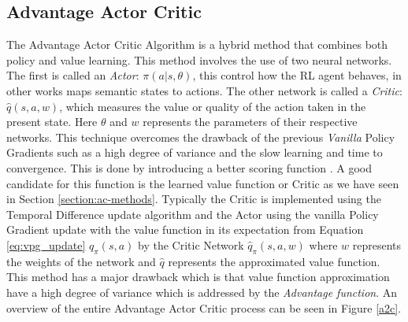 \documentclass[14pt]{extarticle}
\numberwithin{equation}{section}
\begin{document}
	\subsection{Advantage Actor Critic}	\label{a2c-section}
	The Advantage Actor Critic Algorithm is a hybrid method that combines both policy and value learning. This method involves the use of two neural networks. The first is called an \textit{Actor}: $\pi(a|s,\theta)$, this control how the RL agent behaves, in other works maps semantic states to actions. The other network is called a \textit{Critic}: $\hat{q}(s,a,w)$, which measures the value or quality of the action taken in the present state. Here $\theta$ and $w$ represents the parameters of their respective networks. This technique overcomes the drawback of the previous \textit{Vanilla} Policy Gradients such as a high degree of variance and the slow learning and time to convergence. This is done by introducing a better scoring function \cite{Sutton_pg}. A good candidate for this function is the learned value function or Critic as we have seen in Section \ref{section:ac-methods}. Typically the Critic is implemented using the Temporal Difference update algorithm and the Actor using the vanilla Policy Gradient update with the value function in its expectation from Equation \ref{eq:vpg_update} $q_{\pi}(s,a)$ by the Critic Network $\hat{q}_{\pi}(s,a,w)$ where $w$ represents the weights of the network and $\hat{q}$ represents the approximated value function. This method has a major drawback which is that value function approximation have a high degree of variance which is addressed by the \textit{Advantage function}. An overview of the entire Advantage Actor Critic process can be seen in Figure \ref{a2c}.
\end{document}

